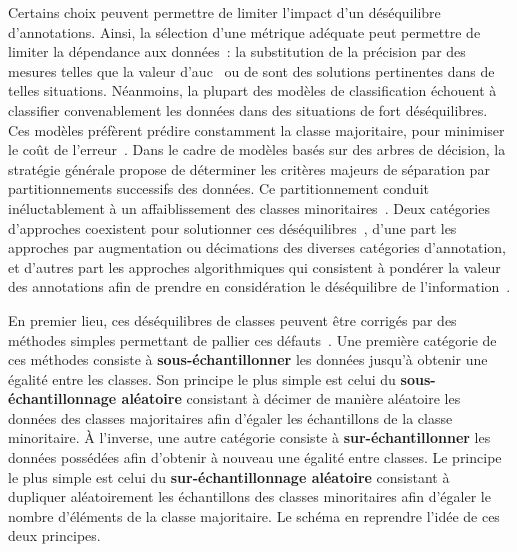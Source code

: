 Certains choix peuvent permettre de limiter l'impact d'un déséquilibre d'annotations. Ainsi, la sélection d'une métrique adéquate peut permettre de limiter la dépendance aux données~: la substitution de la précision par des mesures telles que la valeur d'\gls{auc}~\cite{Celebi2007} ou de \fscore{} sont des solutions pertinentes dans de telles situations. Néanmoins, la plupart des modèles de classification échouent à classifier convenablement les données dans des situations de fort déséquilibres. Ces modèles préfèrent prédire constamment la classe majoritaire, pour minimiser le coût de l'erreur~\cite{Huang2013}. Dans le cadre de modèles basés sur des arbres de décision, la stratégie générale propose de déterminer les critères majeurs de séparation par partitionnements successifs des données. Ce partitionnement conduit inéluctablement à un affaiblissement des classes minoritaires~\cite{He2009}. Deux catégories d'approches coexistent pour solutionner ces déséquilibres~\cite{Huang2013}, d'une part les approches par augmentation ou décimations des diverses catégories d'annotation, et d'autres part les approches algorithmiques qui consistent à pondérer la valeur des annotations afin de prendre en considération le déséquilibre de l'information~\cite{Ting2002,He2009,Thai2010}.\par

En premier lieu, ces déséquilibres de classes peuvent être corrigés par des méthodes simples permettant de pallier ces défauts~\cite{Prati2009, He2009}. Une première catégorie de ces méthodes consiste à \textbf{sous-échantillonner} les données jusqu'à obtenir une égalité entre les classes. Son principe le plus simple est celui du \textbf{sous-échantillonnage aléatoire} consistant à décimer de manière aléatoire les données des classes majoritaires afin d'égaler les échantillons de la classe minoritaire. À l'inverse, une autre catégorie consiste à \textbf{sur-échantillonner} les données possédées afin d'obtenir à nouveau une égalité entre classes. Le principe le plus simple est celui du \textbf{sur-échantillonnage aléatoire} consistant à dupliquer aléatoirement les échantillons des classes minoritaires afin d'égaler le nombre d'éléments de la classe majoritaire. Le schéma en  reprendre l'idée de ces deux principes.\par

